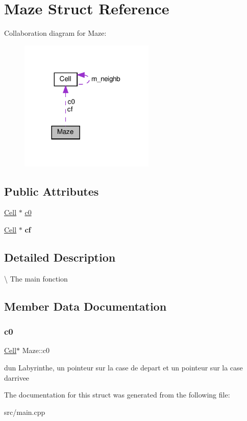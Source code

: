 \hypertarget{struct_maze}{}\section{Maze Struct Reference}
\label{struct_maze}


Collaboration diagram for Maze\+:\nopagebreak
\begin{figure}[H]
\begin{center}
\leavevmode
\includegraphics[width=182pt]{struct_maze__coll__graph}
\end{center}
\end{figure}
\subsection*{Public Attributes}
\begin{DoxyCompactItemize}
\item 
\hyperlink{class_cell}{Cell} $\ast$ \hyperlink{struct_maze_a81a6cfdc1379f055e64da0e575231701}{c0}
\item 
\mbox{\label{struct_maze_ad6d07fca9b5fd8a5c0ac9ff68d553256}} 
\hyperlink{class_cell}{Cell} $\ast$ {\bfseries cf}
\end{DoxyCompactItemize}


\subsection{Detailed Description}
\textbackslash{} The main fonction 

\subsection{Member Data Documentation}
\mbox{\label{struct_maze_a81a6cfdc1379f055e64da0e575231701}} 
\subsubsection{\texorpdfstring{c0}{c0}}
{\footnotesize\ttfamily \hyperlink{class_cell}{Cell}$\ast$ Maze\+::c0}

d\textquotesingle{}un Labyrinthe, un pointeur sur la case de depart et un pointeur sur la case d\textquotesingle{}arrivee 

The documentation for this struct was generated from the following file\+:\begin{DoxyCompactItemize}
\item 
src/main.\+cpp\end{DoxyCompactItemize}
